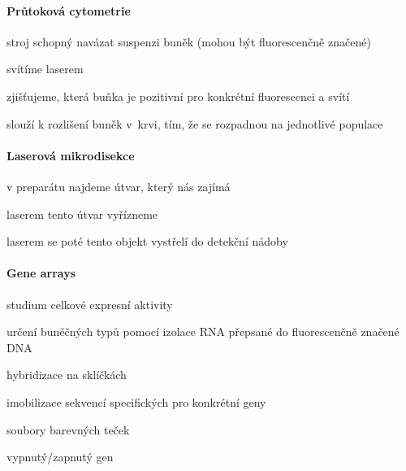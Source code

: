 \documentclass[DIV=8]{scrreprt}
\begin{document}
\paragraph{Průtoková cytometrie}
\begin{myItemize}[nosep]
    \item stroj schopný navázat suspenzi buněk (mohou být fluorescenčně značené)
\begin{myEnumerate}[nosep]
    \item svítíme laserem
    \item zjišťujeme, která buňka je pozitivní pro konkrétní fluorescenci a svítí
\end{myEnumerate}

    \item slouží k rozlišení buněk v krvi, tím, že se rozpadnou na jednotlivé populace
\end{myItemize}



\paragraph{Laserová mikrodisekce}
\begin{myEnumerate}[nosep]
    \item v preparátu najdeme útvar, který nás zajímá
    \item laserem tento útvar vyřízneme
    \item laserem se poté tento objekt vystřelí do detekční nádoby
\end{myEnumerate}



\paragraph{Gene arrays}
\begin{myItemize}[nosep]
    \item studium celkové expresní aktivity
    \item určení buněčných typů pomocí izolace RNA přepsané do fluorescenčně značené DNA
\begin{myEnumerate}[nosep]
    \item hybridizace na sklíčkách
    \item imobilizace sekvencí specifických pro konkrétní geny
    \item soubory barevných teček
    \item vypnutý/zapnutý gen
\end{myEnumerate}

\end{myItemize}
\end{document}
